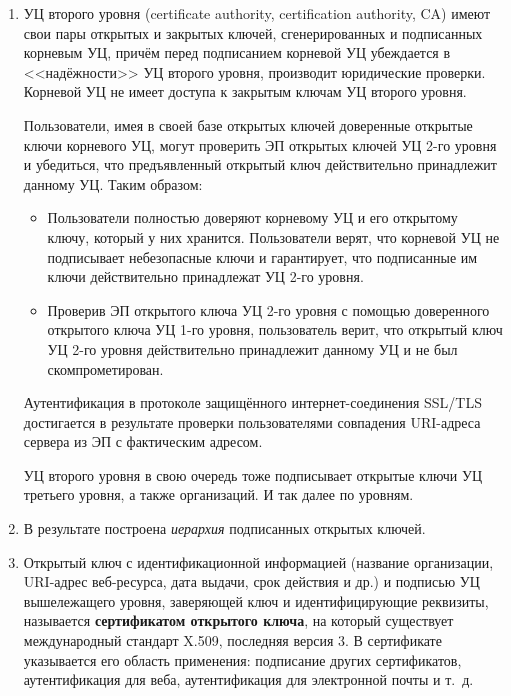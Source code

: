 \begin{enumerate}
    \item УЦ второго уровня (certificate authority, certification authority, CA) имеют свои пары открытых и закрытых ключей, сгенерированных и подписанных корневым УЦ, причём перед подписанием корневой УЦ убеждается в <<надёжности>> УЦ второго уровня, производит юридические проверки. Корневой УЦ не имеет доступа к закрытым ключам УЦ второго уровня.

        Пользователи, имея в своей базе открытых ключей доверенные открытые ключи корневого УЦ, могут проверить ЭП открытых ключей УЦ 2-го уровня и убедиться, что предъявленный открытый ключ действительно принадлежит данному УЦ. Таким образом:
        \begin{itemize}
            \item Пользователи полностью доверяют корневому УЦ и его открытому ключу, который у них хранится. Пользователи верят, что корневой УЦ не подписывает небезопасные ключи и гарантирует, что подписанные им ключи действительно принадлежат УЦ 2-го уровня.
            \item Проверив ЭП открытого ключа УЦ 2-го уровня с помощью доверенного открытого ключа УЦ 1-го уровня, пользователь верит, что открытый ключ УЦ 2-го уровня действительно принадлежит данному УЦ и не был скомпрометирован.
        \end{itemize}

        Аутентификация в протоколе защищённого интернет-соединения SSL/TLS достигается в результате проверки пользователями совпадения URI-адреса сервера из ЭП с фактическим адресом.

        УЦ второго уровня в свою очередь тоже подписывает открытые ключи УЦ третьего уровня, а также организаций. И так далее по уровням.

    \item В результате построена \emph{иерархия} подписанных открытых ключей.

    \item Открытый ключ с идентификационной информацией (название организации, URI-адрес веб-ресурса, дата выдачи, срок действия и др.) и подписью УЦ вышележащего уровня, заверяющей ключ и идентифицирующие реквизиты, называется \textbf{сертификатом открытого ключа}, на который существует международный стандарт X.509, последняя версия 3. В сертификате указывается его область применения: подписание других сертификатов, аутентификация для веба, аутентификация для электронной почты и т.~д.
\end{enumerate}

